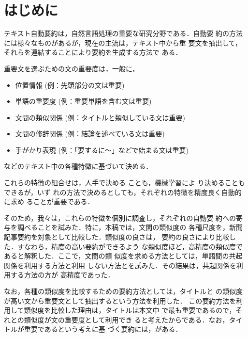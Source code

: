 \maketitle


\section{はじめに}
\label{sec:intro}

テキスト自動要約は，自然言語処理の重要な研究分野である．自動要
約の方法には様々なものがあるが，現在の主流は，テキスト中から重
要文を抽出して，それらを連結することにより要約を生成する方法で
ある\cite{oku99}．

重要文を選ぶための文の重要度は，一般に，
\begin{itemize}
\item 位置情報 (例：先頭部分の文は重要)
\item 単語の重要度 (例：重要単語を含む文は重要)
\item 文間の類似関係 (例：タイトルと類似している文は重要)
\item 文間の修辞関係 (例：結論を述べている文は重要)
\item 手がかり表現 (例：「要するに〜」などで始まる文は重要)
\end{itemize}
などのテキスト中の各種特徴に基づいて決める\cite{oku99}．

これらの特徴の組合せは，人手で決める
\cite{edmundson69:_new_method_autom_extrac}ことも，機械学習によ
り決める\cite{kupiec95:_train_docum_summar}こともできるが，いず
れの方法で決めるとしても，それぞれの特徴を精度良く自動的に求め
ることが重要である．

そのため，我々は，これらの特徴を個別に調査し，それぞれの自動要
約への寄与を調べることを試みた．特に，本稿では，文間の類似度の
各種尺度を，新聞記事要約を対象として比較した．類似度の良さは，
要約の良さにより比較した．すなわち，精度の高い要約ができるよう
な類似度ほど，高精度の類似度であると解釈した．ここで，文間の類
似度を求める方法としては，単語間の共起関係を利用する方法と利用
しない方法とを試みた．その結果は，共起関係を利用する方法の方が
高精度であった．

なお，各種の類似度を比較するための要約方法としては，タイトルと
の類似度が高い文から重要文として抽出するという方法を利用した．
この要約方法を利用して類似度を比較した理由は，タイトルは本文中
で最も重要であるので，それとの類似度が文の重要度として利用でき
ると考えたからである．なお，タイトルが重要であるという考えに基
づく要約には，\cite[など]
{yoshimi98:_evaluat_impor_senten_connec_title,okunishi98}がある．


